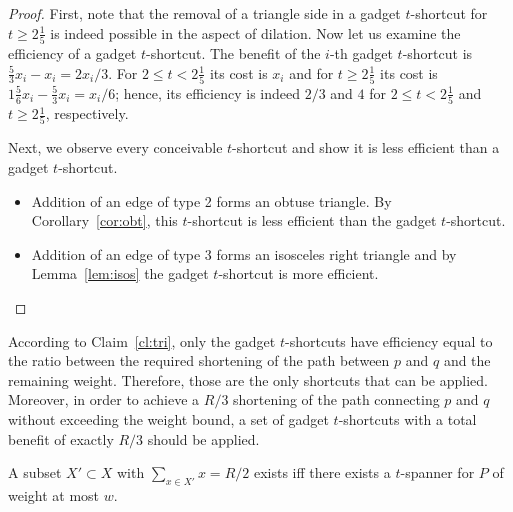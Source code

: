 \documentclass[a4paper]{llncs}
\newcommand{\smallt}{$2 \leq t <2 \frac{1}{5}$}
\newcommand{\bigt}{$t \geq 2 \frac{1}{5}$}
\begin{document}
\begin{proof}
First, note that the removal of a triangle side in a gadget $t$-shortcut for \bigt{}
is indeed possible in the aspect of dilation.
Now let us examine the efficiency of a gadget $t$-shortcut.
The benefit of the $i$-th gadget $t$-shortcut is $\frac{5}{3}x_i-x_i = 2x_i/3$.
For \smallt{} its cost is $x_i$ and for \bigt{} its cost is $1\frac{5}{6}x_i-\frac{5}{3}x_i=x_i/6$; 
hence, its efficiency is indeed $2/3$ and $4$ for \smallt{} and \bigt{}, respectively.

Next, we observe every conceivable $t$-shortcut and show it is less efficient than a gadget $t$-shortcut.

\begin{itemize}

\item Addition of an edge of type 2 forms an obtuse triangle.
By Corollary~\ref{cor:obt}, this $t$-shortcut is less efficient than the gadget $t$-shortcut.

\item Addition of an edge of type 3 forms an isosceles right triangle 
and by Lemma~\ref{lem:isos} the gadget $t$-shortcut is more efficient.

\end{itemize}
\end{proof}


According to Claim~\ref{cl:tri}, only the gadget $t$-shortcuts have efficiency equal to
the ratio between the required shortening of the path between $p$ and $q$ and the remaining weight.
Therefore, those are the only shortcuts that can be applied.
Moreover, in order to achieve a $R/3$ shortening of the path connecting $p$ and $q$
without exceeding the weight bound, a set of gadget $t$-shortcuts 
with a total benefit of exactly $R/3$ should be applied. 

\begin{lemma}\label{lem:red}
A subset $X'\subset X$ with $\sum_{x \in X'} x =R/2$ exists 
iff there exists a $t$-spanner for $P$ of weight at most $w$.
\end{lemma} 
\end{document}
